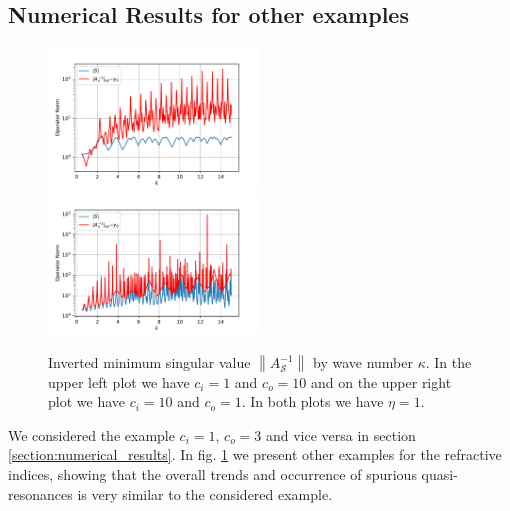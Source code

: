 \documentclass[12pt,journal,compsoc, onecolumn]{IEEEtran}
\begin{document}
\subsection{Numerical Results for other examples}
\begin{figure}
    \includegraphics[width=0.5\textwidth]{simulation_scenario_3indexrange_-30.0-0.0_y_0_1.1849871455878584.pdf}
    \includegraphics[width=0.5\textwidth]{simulation_scenario_4indexrange_-30.0-0.0_y_0_-0.2657606786884559.pdf} 
    \caption{Inverted minimum singular value $\left\|A_{\mathcal{S}}^{-1}\right\|$ by wave number $\kappa$. 
    In the upper left plot we have $c_i = 1$ and $c_o = 10$
    and on the upper right plot we have $c_i = 10$ and $c_o = 1$. In both plots we have $\eta = 1$.}
   \label{fig:c_other_results}
\end{figure}
\noindent
We considered the example $c_i = 1$, $c_o = 3$ and vice versa in section \ref{section:numerical_results}. In fig. \ref{fig:c_other_results} we present other examples for the refractive indices, showing that the overall trends and occurrence of spurious quasi-resonances is very similar to the considered example. \\
\end{document}
